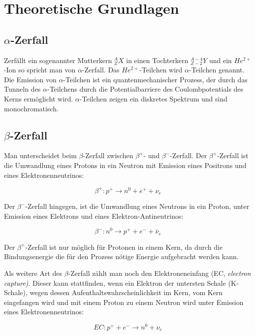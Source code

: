 \section{Theoretische Grundlagen}


\subsection{$\alpha$-Zerfall}

Zerfällt ein sogenannter Mutterkern $_Z^AX$ in einen Tochterkern $_{Z-2}^{A-4}Y$ und ein $He^{2+}$-Ion so spricht man von $\alpha$-Zerfall. Das $He^{2+}$-Teilchen wird $\alpha$-Teilchen genannt. Die Emission von $\alpha$-Teilchen ist ein quantenmechanischer Prozess, der durch das Tunneln des $\alpha$-Teilchens durch die Potentialbarriere des Coulombpotentials des Kerns ermöglicht wird. $\alpha$-Teilchen zeigen ein diskretes Spektrum und sind monochromatisch.

\subsection{$\beta$-Zerfall}

Man unterscheidet beim $\beta$-Zerfall zwischen $\beta^+$- und $\beta^-$-Zerfall. Der $\beta^+$-Zerfall ist die Umwandlung eines Protons in ein Neutron mit Emission eines Positrons und eines Elektronenneutrinos:

$$ \beta^+: p^+ \rightarrow n^0 + e^+ + \nu_e $$

Der $\beta^-$-Zerfall hingegen, ist die Umwandlung eines Neutrons in ein Proton, unter Emission eines Elektrons und eines Elektron-Antineutrinos:

$$ \beta^-: n^0 \rightarrow p^+ + e^- + \bar \nu_e $$

Der $\beta^+$-Zerfall ist nur möglich für Protonen in einem Kern, da durch die Bindungsenergie die für den Prozess nötige Energie aufgebracht werden kann.

Als weitere Art des $\beta$-Zerfall zählt man noch den Elektroneneinfang (EC, \emph{electron capture)}. Dieser kann stattfinden, wenn ein Elektron der untersten Schale (K-Schale), wegen dessen Aufenthaltswahrscheinlichkeit im Kern, vom Kern eingefangen wird und mit einem Proton zu einem Neutron wird unter Emission eines Elektronenneutrinos:

$$ EC: p^+ + e^- \rightarrow n^0 + \nu_e $$

